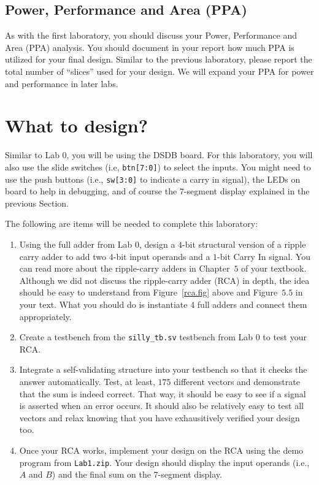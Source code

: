 \documentclass{article}
\begin{document}
\subsection{Power, Performance and Area (PPA)}

As with the first laboratory, you should discuss your
Power, Performance and Area (PPA)
analysis.  You should document in your report how much PPA is utilized
for your final design.  Similar to the previous laboratory, please report
the total number of ``slices'' used for your design.  We will expand
your PPA for power and performance in later labs.

\section{What to design?}

Similar to Lab 0, you will be using the DSDB board.
For this laboratory, you will also use the slide switches (i.e,
\verb!btn[7:0]!) to select the
inputs.  You might need to use the push buttons (i.e., \verb!sw[3:0]!
to indicate a carry in signal), the LEDs on board to help in
debugging, and of course the $7$-segment display
explained in the previous Section.

The following are items will be needed to complete this laboratory:
\begin{enumerate}
  \item Using the full adder from Lab 0, design a $4$-bit structural
    version of a ripple carry
    adder to add two $4$-bit input operands and a $1$-bit Carry In
    signal.  You can read more about the ripple-carry adders in
    Chapter~$5$ of your textbook.  Although we did not discuss the
    ripple-carry adder (RCA) in depth,
    the idea should be easy to understand from
    Figure~\ref{rca.fig} above and Figure~$5.5$ in your text.  What
    you should do is instantiate $4$ full adders and connect them
    appropriately.  
    \item Create a testbench from the \verb!silly_tb.sv! testbench from
      Lab 0 to test your RCA.  
    \item Integrate a self-validating structure into your testbench so
      that it checks the answer automatically.  Test, at least, $175$
      different vectors and demonstrate that the sum is indeed
      correct.  That way, it
      should be easy to see if a signal is asserted when an error
      occurs.
      It should also be relatively easy to test all vectors and
      relax knowing that you have exhausitively verified your design too.
    \item Once your RCA works, implement your design on the RCA
      using the demo program from \verb!Lab1.zip!.  Your design should
      display the input operands (i.e., $A$ and $B$) and the final
      sum on the $7$-segment display.
\end{enumerate}
\end{document}
